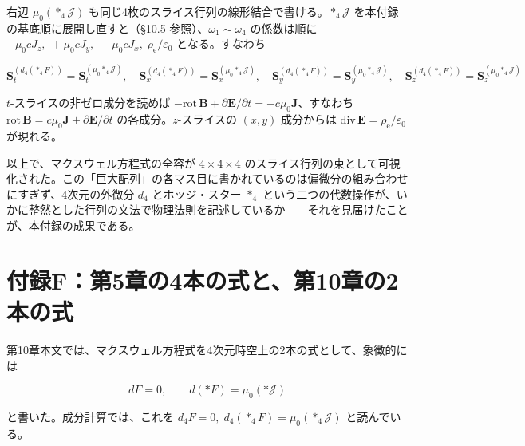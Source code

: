 \documentclass[a4paper,12pt,openany]{book}
\begin{document}
右辺 \(\mu_0(\ast_4\mathcal{J})\)
も同じ4枚のスライス行列の線形結合で書ける。\(\ast_4\mathcal{J}\)
を本付録の基底順に展開し直すと（§10.5
参照）、\(\omega_1\!\sim\!\omega_4\) の係数は順に
\(-\mu_0 c J_z,\; +\mu_0 c J_y,\; -\mu_0 c J_x,\; \rho_{\mathrm e}/\varepsilon_0\)
となる。すなわち

\[
\mathbf{S}_{t}^{(d_4(\ast_4F))} = \mathbf{S}_{t}^{(\mu_0\ast_4\mathcal{J})},\quad
\mathbf{S}_{x}^{(d_4(\ast_4F))} = \mathbf{S}_{x}^{(\mu_0\ast_4\mathcal{J})},\quad
\mathbf{S}_{y}^{(d_4(\ast_4F))} = \mathbf{S}_{y}^{(\mu_0\ast_4\mathcal{J})},\quad
\mathbf{S}_{z}^{(d_4(\ast_4F))} = \mathbf{S}_{z}^{(\mu_0\ast_4\mathcal{J})}
\]

\(t\)-スライスの非ゼロ成分を読めば
\(-\mathrm{rot}\,\mathbf{B} + \partial\mathbf{E}/\partial t = -c\mu_0\mathbf{J}\)、すなわち
\(\mathrm{rot}\,\mathbf{B} = c\mu_0\mathbf{J} + \partial\mathbf{E}/\partial t\)
の各成分。\(z\)-スライスの \((x,y)\) 成分からは
\(\mathrm{div}\,\mathbf{E} = \rho_{\mathrm e}/\varepsilon_0\) が現れる。

\par\vspace{0.35em}\par

以上で、マクスウェル方程式の全容が \(4\times4\times4\)
のスライス行列の束として可視化された。この「巨大配列」の各マス目に書かれているのは偏微分の組み合わせにすぎず、4次元の外微分
\(d_4\) とホッジ・スター \(\ast_4\)
という二つの代数操作が、いかに整然とした行列の文法で物理法則を記述しているか——それを見届けたことが、本付録の成果である。

\par\vspace{0.35em}\par

\hypertarget{ux4ed8ux9332fux7b2c5ux7ae0ux306e4ux672cux306eux5f0fux3068ux7b2c10ux7ae0ux306e2ux672cux306eux5f0f}{%
\section{付録F：第5章の4本の式と、第10章の2本の式}\label{ux4ed8ux9332fux7b2c5ux7ae0ux306e4ux672cux306eux5f0fux3068ux7b2c10ux7ae0ux306e2ux672cux306eux5f0f}}

第10章本文では、マクスウェル方程式を4次元時空上の2本の式として、象徴的には

\[
dF=0,
\qquad
d(\ast F)=\mu_0(\ast\mathcal{J})
\]

と書いた。成分計算では、これを
\(d_4F=0,\;d_4(\ast_4F)=\mu_0(\ast_4\mathcal J)\) と読んでいる。
\end{document}

